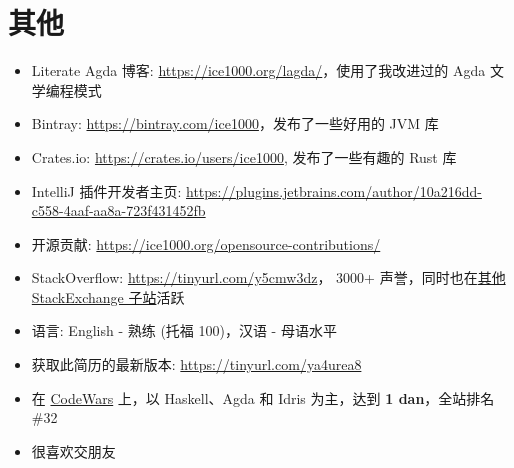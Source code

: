 \documentclass{resume}
\begin{document}
\section{其他}
\begin{itemize}[parsep=0.25ex]
  \item Literate Agda 博客: \url{https://ice1000.org/lagda/}，使用了我改进过的 Agda 文学编程模式
  \item Bintray: \url{https://bintray.com/ice1000}，发布了一些好用的 JVM 库
  \item Crates.io: \url{https://crates.io/users/ice1000}, 发布了一些有趣的 Rust 库
  \item IntelliJ 插件开发者主页: \url{https://plugins.jetbrains.com/author/10a216dd-c558-4aaf-aa8a-723f431452fb}
  \item 开源贡献: \url{https://ice1000.org/opensource-contributions/}
  \item StackOverflow: \url{https://tinyurl.com/y5cmw3dz}，
    3000+ 声誉，同时也在\href{https://stackexchange.com/users/9532102/} {其他 StackExchange 子站}活跃
  \item 语言: English - 熟练 (托福 100)，汉语 - 母语水平
  \item 获取此简历的最新版本: \url{https://tinyurl.com/ya4urea8}
  \item 在
    \href{https://www.codewars.com/users/ice1000} {CodeWars}
    上，以 Haskell、Agda 和 Idris 为主，达到 \textbf{1 dan}，全站排名 \#32
  \item 很喜欢交朋友
\end{itemize}

%
%
\end{document}
